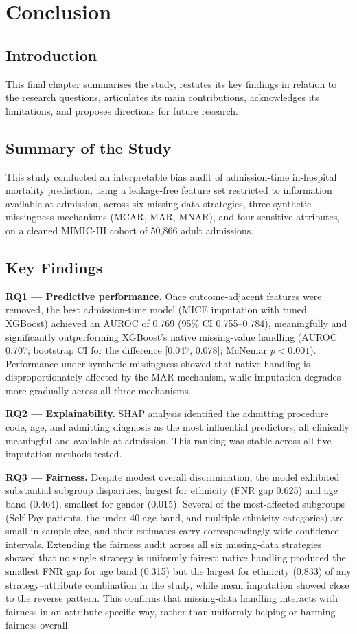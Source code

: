 \documentclass[12pt,a4paper]{report}
\begin{document}
\chapter{Conclusion}

\section{Introduction}
This final chapter summarises the study, restates its key findings in relation to the research questions, articulates its main contributions, acknowledges its limitations, and proposes directions for future research.


\section{Summary of the Study}
This study conducted an interpretable bias audit of admission-time in-hospital mortality prediction, using a leakage-free feature set restricted to information available at admission, across six missing-data strategies, three synthetic missingness mechanisms (MCAR, MAR, MNAR), and four sensitive attributes, on a cleaned MIMIC-III cohort of 50,866 adult admissions.


\section{Key Findings}

\textbf{RQ1 --- Predictive performance.} Once outcome-adjacent features were removed, the best admission-time model (MICE imputation with tuned XGBoost) achieved an AUROC of 0.769 (95\% CI 0.755--0.784), meaningfully and significantly outperforming XGBoost's native missing-value handling (AUROC 0.707; bootstrap CI for the difference [0.047, 0.078]; McNemar $p<0.001$). Performance under synthetic missingness showed that native handling is disproportionately affected by the MAR mechanism, while imputation degrades more gradually across all three mechanisms.

\textbf{RQ2 --- Explainability.} SHAP analysis identified the admitting procedure code, age, and admitting diagnosis as the most influential predictors, all clinically meaningful and available at admission. This ranking was stable across all five imputation methods tested.

\textbf{RQ3 --- Fairness.} Despite modest overall discrimination, the model exhibited substantial subgroup disparities, largest for ethnicity (FNR gap 0.625) and age band (0.464), smallest for gender (0.015). Several of the most-affected subgroups (Self-Pay patients, the under-40 age band, and multiple ethnicity categories) are small in sample size, and their estimates carry correspondingly wide confidence intervals. Extending the fairness audit across all six missing-data strategies showed that no single strategy is uniformly fairest: native handling produced the smallest FNR gap for age band (0.315) but the largest for ethnicity (0.833) of any strategy--attribute combination in the study, while mean imputation showed close to the reverse pattern. This confirms that missing-data handling interacts with fairness in an attribute-specific way, rather than uniformly helping or harming fairness overall.
\end{document}
